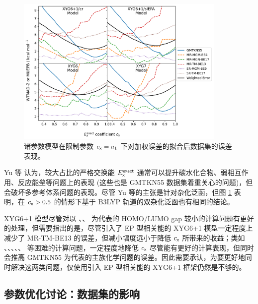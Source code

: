 \begin{figure}[t]
  \centering
  \includegraphics[width=0.9\textwidth]{assets/plot-seq.pdf}
  \caption[诸参数模型在限制 $E_\textmt{x}^\textmt{exact}$ 系数下参数优化后误差]{诸参数模型在限制参数 $c_{\textsf{x}} = a_1$ 下对加权误差的拟合后数据集的误差表现。}
  \label{fig.2.plot-seq}
\end{figure}

Yu 等\cite{Yu-Truhlar.CS.2016} 认为，较大占比的严格交换能 $E_\textmt{x}^\textmt{exact}$ 通常可以提升碳水化合物、弱相互作用、反应能垒等问题上的表现 (这些也是 GMTKN55 数据集着重关心的问题)，但会破坏多参考体系问题的表现。尽管 Yu 等的主张是针对杂化泛函，但图 \ref{fig.2.plot-seq} 表明，在 $c_{\textsf{x}} > 0.5$ 的情形下基于 B3LYP 轨道的双杂化泛函也有相同的结论。

XYG6+1 模型尽管对以 、、 为代表的 HOMO/LUMO gap 较小的计算问题有更好的处理，但需要指出的是，尽管引入了 EP 型相关能的 XYG6+1 模型一定程度上减少了 MR-TM-BE13 的误差，但减小幅度远小于降低 $c_{\textsf{x}}$ 所带来的收益；类如 、、、、、 等困难的计算问题，一定程度地降低 $c_{\textsf{x}}$ 尽管能有更好的计算表现，但同时会推高 GMTKN55 为代表的主族化学问题的误差。因此需要承认，为要更好地同时解决这两类问题，仅使用引入 EP 型相关能的 XYG6+1 框架仍然是不够的。

\subsection{参数优化讨论：数据集的影响}
\label{sec.2.propotion-dataset}

